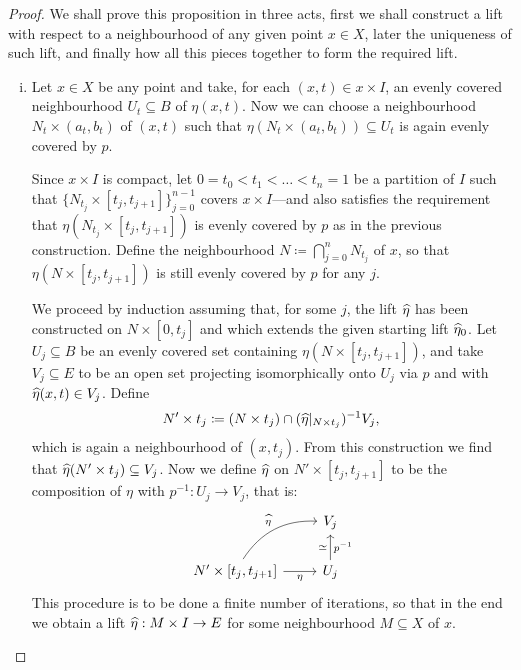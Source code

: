 \begin{proof}
    We shall prove this proposition in three acts, first we shall construct a lift
    with respect to a neighbourhood of any given point \(x \in X\), later the
    uniqueness of such lift, and finally how all this pieces together to form the
    required lift.

    \begin{enumerate}[(i)]\setlength\itemsep{0em}
        \item Let \(x \in X\) be any point and take, for each \((x, t) \in x \times I\),
              an evenly covered neighbourhood \(U_t \subseteq B\) of \(\eta(x, t)\). Now we
              can choose a neighbourhood \(N_t \times (a_t, b_t)\) of \((x, t)\) such that
              \(\eta(N_t \times (a_t, b_t)) \subseteq U_t\) is again evenly covered by
              \(p\).

              Since \(x \times I\) is compact, let \(0 = t_0 < t_1 < \dots < t_n = 1\) be a
              partition of \(I\) such that \(\{N_{t_j} \times [t_j, t_{j+1}]\}_{j=0}^{n-1}\)
              covers \(x \times I\)---and also satisfies the requirement that
              \(\eta(N_{t_j} \times [t_j, t_{j+1}])\) is evenly covered by \(p\) as in the
              previous construction. Define the neighbourhood
              \(N \coloneq \bigcap_{j=0}^n N_{t_j}\) of \(x\), so that
              \(\eta(N \times [t_j, t_{j+1}])\) is still evenly covered by \(p\) for any \(j\).

              We proceed by induction assuming that, for some \(j\), the lift \(\widehat \eta\)
              has been constructed on \(N \times [0, t_j]\) and which extends the given
              starting lift \(\widehat \eta_0\). Let \(U_j \subseteq B\) be an evenly covered
              set containing \(\eta(N \times [t_j, t_{j+1}])\), and take
              \(V_j \subseteq E\) to be an open set projecting isomorphically onto \(U_j\)
              via \(p\) and with \(\widehat\eta(x, t) \in V_j\).  Define
              \[
                  N' \times t_j \coloneq (N \times t_j) \cap (\widehat\eta|_{N \times t_j})^{-1} V_j,
              \]
              which is again a neighbourhood of \((x, t_j)\). From this construction we find
              that \(\widehat\eta(N' \times t_j) \subseteq V_j\). Now we define \(\widehat\eta\)
              on \(N' \times [t_j, t_{j+1}]\) to be the composition of \(\eta\) with
              \(p^{-1}: U_j \to V_j\), that is:
              \[
                  \begin{tikzcd}
                      &V_j \\
                      N' \times [t_j, t_{j+1}]
                      \ar[ru, bend left, "\lift\eta"]
                      \ar[r, "\eta"']
                      & U_j \ar[u, "p^{-1}"', "\dis"]
                  \end{tikzcd}
              \]
              This procedure is to be done a finite number of iterations, so that in the end
              we obtain a lift \(\widehat\eta: M \times I \to E\) for some neighbourhood
              \(M \subseteq X\) of \(x\).


\end{enumerate}
\end{proof}
